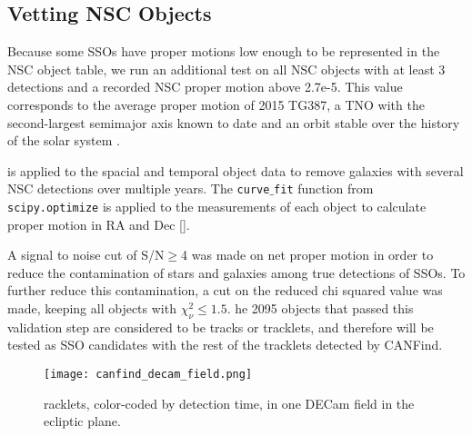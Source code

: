 \documentclass[twocolumn]{aastex62}
\begin{document}
\subsection{Vetting NSC Objects}
\label{ssec:nscobj}
Because some SSOs have proper motions low enough to be represented in the NSC object table, we run an additional test on all NSC objects with at least 3 detections and a recorded NSC proper motion above 2.7e-5\ded\editoneb{)}.  This value corresponds to the average proper motion of 2015 TG387, a TNO with the second-largest semimajor axis known to date  and an orbit stable over the history of the solar system \citep{shep19}.  

      is applied to the spacial and temporal object data to remove galaxies with several NSC detections over multiple years.  The \texttt{curve$\_$fit} function from \texttt{scipy.optimize} is applied to the measurements of each object to calculate proper motion in RA and Dec [\arh].  

A signal to noise cut of S/N$\geq$4 was made on net proper motion in order to reduce the contamination of stars and galaxies among true detections of SSOs.  To further reduce this contamination, a cut on the reduced chi squared value was made, keeping all objects with $\chi_{\nu}^2\leq1.5$.  he 2095 objects that passed this validation step are considered to be tracks or tracklets, and\eonesout{,} therefore\eonesout{,} will be tested as SSO candidates with the rest of the tracklets detected by CANFind.

\begin{figure*}[ht]
\centering
\texttt{[image: canfind\_decam\_field.png]}
\caption{racklets, color-coded by  detection time, in one DECam field in the ecliptic plane.  }
\label{fig:decam_field}
\end{figure*}
\end{document}
